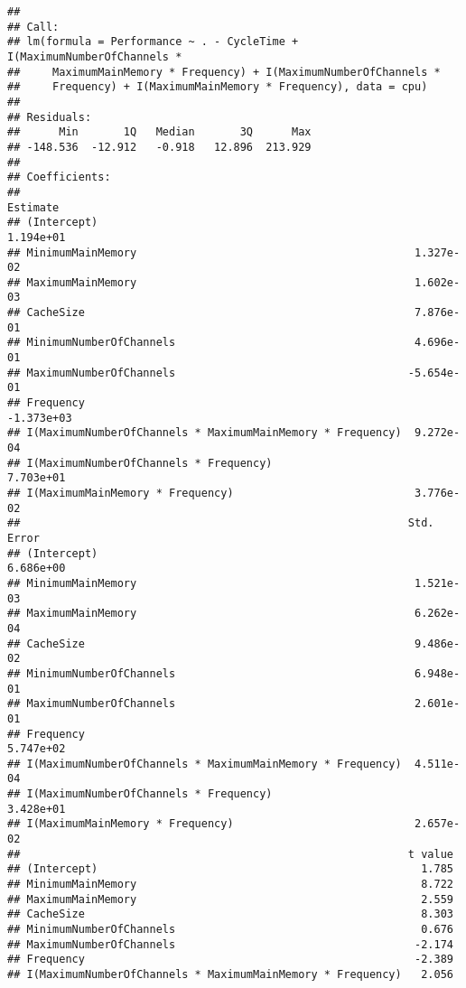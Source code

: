 \documentclass[12pt]{article}
\begin{document}
\begin{verbatim}
## 
## Call:
## lm(formula = Performance ~ . - CycleTime + I(MaximumNumberOfChannels * 
##     MaximumMainMemory * Frequency) + I(MaximumNumberOfChannels * 
##     Frequency) + I(MaximumMainMemory * Frequency), data = cpu)
## 
## Residuals:
##      Min       1Q   Median       3Q      Max 
## -148.536  -12.912   -0.918   12.896  213.929 
## 
## Coefficients:
##                                                              Estimate
## (Intercept)                                                 1.194e+01
## MinimumMainMemory                                           1.327e-02
## MaximumMainMemory                                           1.602e-03
## CacheSize                                                   7.876e-01
## MinimumNumberOfChannels                                     4.696e-01
## MaximumNumberOfChannels                                    -5.654e-01
## Frequency                                                  -1.373e+03
## I(MaximumNumberOfChannels * MaximumMainMemory * Frequency)  9.272e-04
## I(MaximumNumberOfChannels * Frequency)                      7.703e+01
## I(MaximumMainMemory * Frequency)                            3.776e-02
##                                                            Std. Error
## (Intercept)                                                 6.686e+00
## MinimumMainMemory                                           1.521e-03
## MaximumMainMemory                                           6.262e-04
## CacheSize                                                   9.486e-02
## MinimumNumberOfChannels                                     6.948e-01
## MaximumNumberOfChannels                                     2.601e-01
## Frequency                                                   5.747e+02
## I(MaximumNumberOfChannels * MaximumMainMemory * Frequency)  4.511e-04
## I(MaximumNumberOfChannels * Frequency)                      3.428e+01
## I(MaximumMainMemory * Frequency)                            2.657e-02
##                                                            t value
## (Intercept)                                                  1.785
## MinimumMainMemory                                            8.722
## MaximumMainMemory                                            2.559
## CacheSize                                                    8.303
## MinimumNumberOfChannels                                      0.676
## MaximumNumberOfChannels                                     -2.174
## Frequency                                                   -2.389
## I(MaximumNumberOfChannels * MaximumMainMemory * Frequency)   2.056

\end{verbatim}
\end{document}
